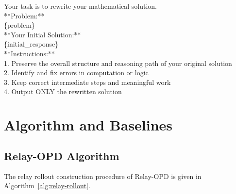 \documentclass{article} %
\begin{document}
\begin{promptbox}[title={TRD Rewrite Prompt}, breakable=false]
Your task is to rewrite your mathematical solution.\\[\baselineskip]
**Problem:**\\
\{problem\}\\[\baselineskip]
**Your Initial Solution:**\\
\{initial\_response\}\\[\baselineskip]
**Instructions:**\\
1. Preserve the overall structure and reasoning path of your original solution\\
2. Identify and fix errors in computation or logic\\
3. Keep correct intermediate steps and meaningful work\\
4. Output ONLY the rewritten solution
\end{promptbox}

\section{Algorithm and Baselines}\label{app:algorithm-baselines}

\subsection{Relay-OPD Algorithm}\label{app:relay-algorithm}

The relay rollout construction procedure of Relay-OPD is given in Algorithm~\ref{alg:relay-rollout}.\par
\end{document}
